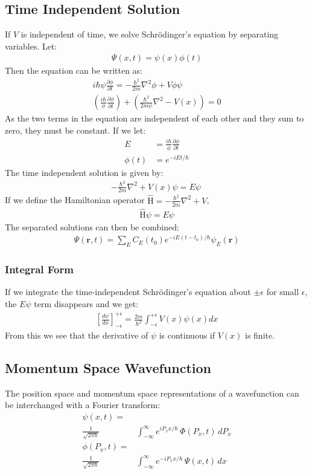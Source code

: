 \documentclass[a4paper]{article}
\newcommand{\ve}[1]{
  \ensuremath{\bm{#1}}}	               %
\newcommand{\pd}[2]{
  \ensuremath{
    \frac{\partial #1}{\partial #2} }} %
\newcommand{\operator}[1]{
  \ensuremath{\hat{\text{#1}}}}        %
\begin{document}
\begin{multicols*}{2}
\subsection{Time Independent Solution}
If $V$ is independent of time, we solve Schr\"{o}dinger's equation by separating
variables. Let:
\begin{align*}
  \Psi(x, t) = \psi(x) \phi(t)
\end{align*}
Then the equation can be written as:
\begin{align*}
  i\hbar \psi \pd{\phi}{t} = -\frac{\hbar^2}{2m} \nabla^2 \phi + V \phi \psi \\
  \left( \frac{i\hbar}{\phi} \pd{\phi}{t} \right) + \left(
    \frac{\hbar^2}{2m\psi} \nabla^2 -V(x) \right) = 0
\end{align*}
As the two terms in the equation are independent of each other and they sum to
zero, they must be constant. If we let:
\begin{align*}
  E &= \frac{i\hbar}{\phi} \pd{\phi}{t} \\
  \phi(t) &= e^{-iEt/ \hbar}
\end{align*}
The time independent solution is given by:
\begin{align*}
  -\frac{\hbar^2}{2m}\nabla^2 + V(x) \psi = E \psi\
\end{align*}
If we define the Hamiltonian operator $\operator{H} = -\frac{\hbar^2}{2m}
\nabla^2 + V$,
\begin{align*}
  \operator{H} \psi = E\psi
\end{align*}
The separated solutions can then be combined:
\begin{align*}
  \Psi (\ve{r}, t) = \sum_E C_E(t_0) e^{-iE(t-t_0)/\hbar} \psi_E(\ve{r})
\end{align*}
\subsubsection{Integral Form}
If we integrate the time-independent Schr\"{o}dinger's equation about
$\pm\epsilon$ for small $\epsilon$, the $E\psi$ term disappears and we get:
\begin{align*}
  \left[ \frac{d\psi}{dx} \right]^{+\epsilon}_{-\epsilon} = \frac{2m}{\hbar^2}
  \int^{+\epsilon}_{-\epsilon} V(x) \psi(x) dx
\end{align*}
From this we see that the derivative of $\psi$ is continuous if $V(x)$ is
finite.
\subsection{Momentum Space Wavefunction}
The position space and momentum space representations of a wavefunction can be
interchanged with a Fourier transform:
\begin{align*}
  \psi (x, t) =& \\ \frac{1}{\sqrt{2\pi \hbar}}
  &\int_{-\infty}^\infty e^{iP_xx/\hbar} \, \Phi(P_x, t) \, dP_x \\
  \phi (P_x, t) =& \\ \frac{1}{\sqrt{2\pi \hbar}}
  &\int_{-\infty}^\infty e^{-iP_xx/\hbar} \, \Psi(x, t) \, dx
\end{align*}

\end{multicols*}
\end{document}
